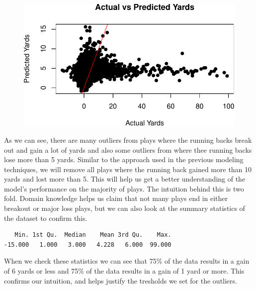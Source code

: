 \documentclass[
  super,
  preprint,
  3p]{elsarticle}
\newenvironment{Shaded}{\begin{snugshade}}{\end{snugshade}}
\newcommand{\FunctionTok}[1]{\textcolor[rgb]{0.28,0.35,0.67}{#1}}
\newcommand{\NormalTok}[1]{\textcolor[rgb]{0.00,0.23,0.31}{#1}}
\newcommand{\SpecialCharTok}[1]{\textcolor[rgb]{0.37,0.37,0.37}{#1}}
\begin{document}
\begin{figure}[H]

{\centering \includegraphics{project_report_files/figure-pdf/unnamed-chunk-51-1.pdf}

}

\end{figure}

As we can see, there are many outliers from plays where the running
backs break out and gain a lot of yards and also some outliers from
where thee running backs lose more than 5 yards. Similar to the approach
used in the previous modeling techniques, we will remove all plays where
the running back gained more than 10 yards and lost more than 5. This
will help us get a better understanding of the model's performance on
the majority of plays. The intuition behind this is two fold. Domain
knowledge helps us claim that not many plays end in either breakout or
major loss plays, but we can also look at the summary statistics of the
dataset to confirm this.

\begin{Shaded}
\end{Shaded}

\begin{verbatim}
   Min. 1st Qu.  Median    Mean 3rd Qu.    Max. 
-15.000   1.000   3.000   4.228   6.000  99.000 
\end{verbatim}

When we check these statistics we can see that 75\% of the data results
in a gain of 6 yards or less and 75\% of the data results in a gain of 1
yard or more. This confirms our intuition, and helps justify the
tresholds we set for the outliers.
\end{document}
